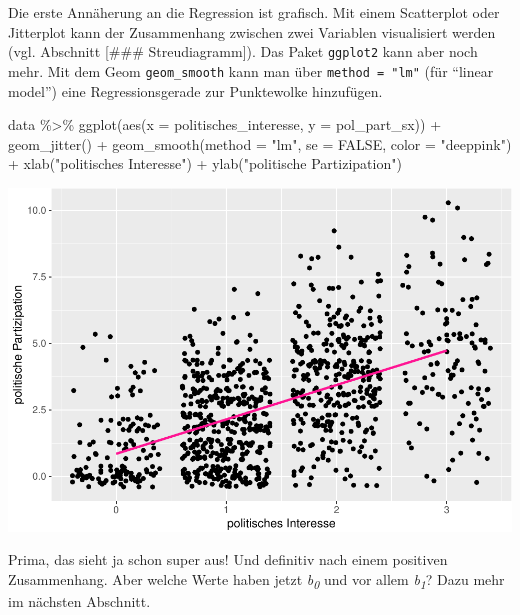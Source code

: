 \documentclass[
]{book}
\newenvironment{Shaded}{\begin{snugshade}}{\end{snugshade}}
\newcommand{\AttributeTok}[1]{\textcolor[rgb]{0.77,0.63,0.00}{#1}}
\newcommand{\ConstantTok}[1]{\textcolor[rgb]{0.00,0.00,0.00}{#1}}
\newcommand{\FunctionTok}[1]{\textcolor[rgb]{0.00,0.00,0.00}{#1}}
\newcommand{\NormalTok}[1]{#1}
\newcommand{\SpecialCharTok}[1]{\textcolor[rgb]{0.00,0.00,0.00}{#1}}
\newcommand{\StringTok}[1]{\textcolor[rgb]{0.31,0.60,0.02}{#1}}
\begin{document}
Die erste Annäherung an die Regression ist grafisch. Mit einem Scatterplot oder Jitterplot kann der Zusammenhang zwischen zwei Variablen visualisiert werden (vgl. Abschnitt {[}\#\#\# Streudiagramm{]}). Das Paket \texttt{ggplot2} kann aber noch mehr. Mit dem Geom \texttt{geom\_smooth} kann man über \texttt{method\ =\ "lm"} (für ``linear model'') eine Regressionsgerade zur Punktewolke hinzufügen.

\begin{Shaded}
\begin{Highlighting}[]
\NormalTok{data }\SpecialCharTok{\%\textgreater{}\%} 
  \FunctionTok{ggplot}\NormalTok{(}\FunctionTok{aes}\NormalTok{(}\AttributeTok{x =}\NormalTok{ politisches\_interesse, }\AttributeTok{y =}\NormalTok{ pol\_part\_sx)) }\SpecialCharTok{+}
  \FunctionTok{geom\_jitter}\NormalTok{() }\SpecialCharTok{+}
  \FunctionTok{geom\_smooth}\NormalTok{(}\AttributeTok{method =} \StringTok{"lm"}\NormalTok{, }\AttributeTok{se =} \ConstantTok{FALSE}\NormalTok{, }\AttributeTok{color =} \StringTok{"deeppink"}\NormalTok{) }\SpecialCharTok{+}
  \FunctionTok{xlab}\NormalTok{(}\StringTok{"politisches Interesse"}\NormalTok{) }\SpecialCharTok{+}
  \FunctionTok{ylab}\NormalTok{(}\StringTok{"politische Partizipation"}\NormalTok{)}
\end{Highlighting}
\end{Shaded}

\includegraphics{r_book_files/figure-latex/unnamed-chunk-86-1.pdf}

Prima, das sieht ja schon super aus! Und definitiv nach einem positiven Zusammenhang. Aber welche Werte haben jetzt \emph{b\textsubscript{0}} und vor allem \emph{b\textsubscript{1}}? Dazu mehr im nächsten Abschnitt.
\end{document}
